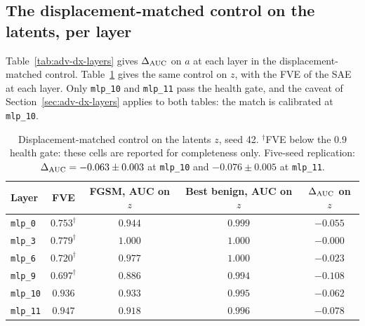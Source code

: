 \documentclass[../ppgc-tese.tex]{subfiles}
\begin{document}
\subsection{The displacement-matched control on the latents, per layer}
\label{sec:adv-matched-dx-z}
Table~\ref{tab:adv-dx-layers} gives $\Delta_{\mathrm{AUC}}$ on $a$ at each layer in the
displacement-matched control. Table~\ref{tab:adv-matched-dx} gives the same
control on $z$, with the FVE of the SAE at each layer. Only \texttt{mlp\_10}
and \texttt{mlp\_11} pass the health gate, and the caveat of
Section~\ref{sec:adv-dx-layers} applies to both tables: the match is
calibrated at \texttt{mlp\_10}.

\begin{table}[ht]
  \centering
  \caption{Displacement-matched control on the latents $z$, seed 42.
  $^{\dagger}$FVE below the $0.9$ health gate: these cells are reported for
  completeness only. Five-seed replication: $\Delta_{\mathrm{AUC}} = -0.063\pm0.003$ at
  \texttt{mlp\_10} and $-0.076\pm0.005$ at \texttt{mlp\_11}.}
  \label{tab:adv-matched-dx}
  \small
  \begin{tabular}{@{}lcccc@{}}
    \toprule
    Layer & FVE & FGSM, AUC on $z$ & Best benign, AUC on $z$ & $\Delta_{\mathrm{AUC}}$ on $z$ \\
    \midrule
    \texttt{mlp\_0}  & $0.753^{\dagger}$ & $0.944$ & $0.999$ & $-0.055$ \\
    \texttt{mlp\_3}  & $0.779^{\dagger}$ & $1.000$ & $1.000$ & $-0.000$ \\
    \texttt{mlp\_6}  & $0.720^{\dagger}$ & $0.977$ & $1.000$ & $-0.023$ \\
    \texttt{mlp\_9}  & $0.697^{\dagger}$ & $0.886$ & $0.994$ & $-0.108$ \\
    \texttt{mlp\_10} & $0.936$ & $0.933$ & $0.995$ & $-0.062$ \\
    \texttt{mlp\_11} & $0.947$ & $0.918$ & $0.996$ & $-0.078$ \\
    \bottomrule
  \end{tabular}
\end{table}
\end{document}
